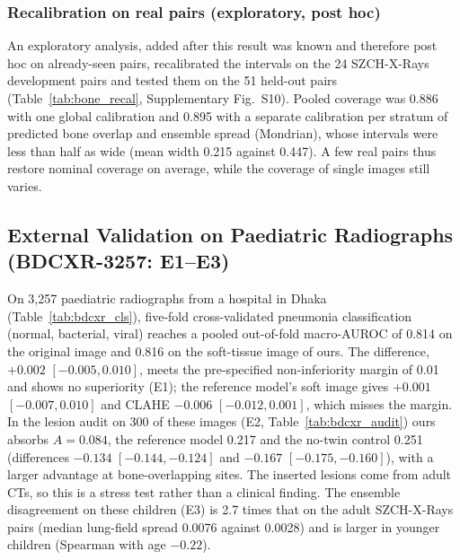 \subsubsection{Recalibration on real pairs (exploratory, post hoc)}
An exploratory analysis, added after this result was known and therefore post hoc on already-seen pairs, recalibrated the intervals on the
24 SZCH-X-Rays development pairs and tested them on the 51 held-out pairs (Table~\ref{tab:bone_recal}, Supplementary Fig.~S10). Pooled
coverage was 0.886 with one global calibration and 0.895 with a separate calibration per stratum of predicted bone overlap and ensemble
spread (Mondrian), whose intervals were less than half as wide (mean width 0.215 against 0.447). A few real pairs thus restore nominal
coverage on average, while the coverage of single images still varies.

\begin{table}[!t]
\centering
\caption{Exploratory recalibration on real pairs (post hoc): bone-image intervals calibrated on the 24 SZCH-X-Rays development pairs and
tested on the 51 held-out pairs at nominal 0.90. Mondrian: calibration per stratum of predicted bone overlap and ensemble spread.}
\label{tab:bone_recal}
\end{table}

\subsection{External Validation on Paediatric Radiographs (BDCXR-3257: E1--E3)}
\label{sec:res-bdcxr}
On 3,257 paediatric radiographs from a hospital in Dhaka (Table~\ref{tab:bdcxr_cls}), five-fold cross-validated pneumonia classification
(normal, bacterial, viral) reaches a pooled out-of-fold macro-AUROC of 0.814 on the original image and 0.816 on the soft-tissue image of
ours. The difference, $+0.002$ $[-0.005,0.010]$, meets the pre-specified non-inferiority margin of 0.01 and shows no superiority (E1); the
reference model's soft image gives $+0.001$ $[-0.007,0.010]$ and CLAHE $-0.006$ $[-0.012,0.001]$, which misses the margin. In the lesion
audit on 300 of these images (E2, Table~\ref{tab:bdcxr_audit}) ours absorbs $A=0.084$, the reference model 0.217 and the no-twin control
0.251 (differences $-0.134$ $[-0.144,-0.124]$ and $-0.167$ $[-0.175,-0.160]$), with a larger advantage at bone-overlapping sites. The
inserted lesions come from adult CTs, so this is a stress test rather than a clinical finding. The ensemble disagreement on these children
(E3) is 2.7 times that on the adult SZCH-X-Rays pairs (median lung-field spread 0.0076 against 0.0028) and is larger in younger children
(Spearman with age $-0.22$).


